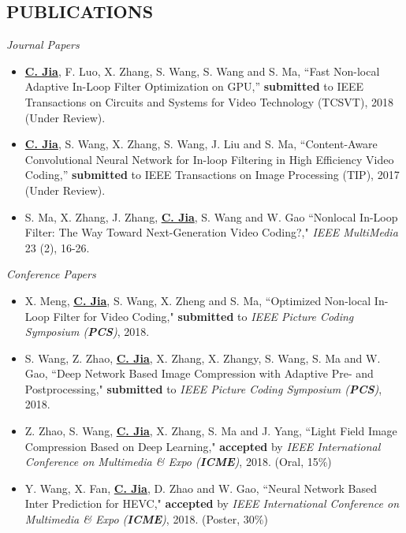 \documentclass[margin, 10pt]{res} %
\begin{document}
\begin{resume}

\section{PUBLICATIONS}
{\sl Journal Papers}
\begin{itemize}
\item{\underline{\bf C. Jia}, F. Luo, X. Zhang, S. Wang, S. Wang and S. Ma, ``Fast Non-local Adaptive In-Loop Filter Optimization on GPU,” {\bf submitted} to IEEE Transactions on Circuits and Systems for Video Technology (TCSVT), 2018 (Under Review).}
\item{\underline{\bf C. Jia}, S. Wang, X. Zhang, S. Wang, J. Liu and S. Ma, ``Content-Aware Convolutional Neural Network for In-loop Filtering in High Efficiency Video Coding,” {\bf submitted} to IEEE Transactions on Image Processing (TIP), 2017 (Under Review).}
\item{S. Ma, X. Zhang, J. Zhang, \underline{\bf C. Jia}, S. Wang and W. Gao ``Nonlocal In-Loop Filter: The Way Toward Next-Generation Video Coding?," {\em {IEEE} MultiMedia} 23 (2), 16-26.}
\end{itemize}

{\sl Conference Papers}
\begin{itemize}
\item{X. Meng, \underline{\bf C. Jia}, S. Wang, X. Zheng and S. Ma, ``Optimized Non-local In-Loop Filter for Video Coding," {\bf submitted} to {\em IEEE Picture Coding Symposium ({\bf PCS})}, 2018. }

\item{S. Wang, Z. Zhao, \underline{\bf C. Jia}, X. Zhang, X. Zhangy, S. Wang, S. Ma and W. Gao, ``Deep Network Based Image Compression with Adaptive Pre- and Postprocessing," {\bf submitted} to {\em IEEE Picture Coding Symposium ({\bf PCS})}, 2018. }

\item{Z. Zhao, S. Wang, \underline{\bf C. Jia}, X. Zhang, S. Ma and J. Yang, ``Light Field Image Compression Based on Deep Learning," {\bf accepted} by {\em IEEE International Conference on Multimedia \& Expo ({\bf ICME})}, 2018. (Oral, 15\%)}

\item{Y. Wang, X. Fan, \underline{\bf C. Jia}, D. Zhao and W. Gao, ``Neural Network Based Inter Prediction for HEVC," {\bf accepted} by {\em IEEE International Conference on Multimedia \& Expo ({\bf ICME})}, 2018. (Poster, 30\%)}


\end{itemize}
\end{resume}
\end{document}
